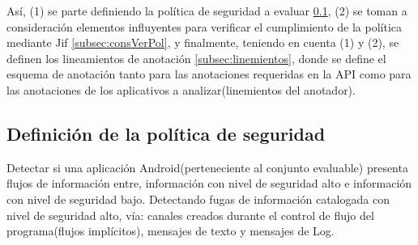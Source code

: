 % 
% 

Así, (1) se parte definiendo la política de seguridad a evaluar
\ref{subsection:politica}, (2) se toman a consideración elementos influyentes
para verificar el cumplimiento de la política mediante Jif
\ref{subsec:consVerPol}, y finalmente, teniendo en cuenta (1) y (2), se definen
los lineamientos de anotación \ref{subsec:linemientos}, donde se define el
esquema de anotación tanto para las anotaciones requeridas en la API como para
las anotaciones de los aplicativos a analizar(linemientos del anotador).

\subsection{Definición de la política de seguridad}
\label{subsection:politica}
Detectar si una aplicación Android(perteneciente al conjunto evaluable) presenta
flujos de información entre, información con nivel de seguridad alto e
información con nivel de seguridad bajo.\newline
Detectando fugas de información catalogada con nivel de seguridad alto, vía:
canales creados durante el control de flujo del programa(flujos implícitos),
mensajes de texto y mensajes de Log.\newline 

